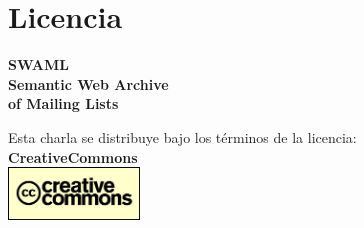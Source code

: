 \documentclass[spanish,notes=hide]{beamer}
\begin{document}
\section{Licencia}
\frame
{
  \begin{center}
    \LARGE{%
	\textbf{SWAML}\\
	\textbf{Semantic Web Archive\\of Mailing Lists}
    }\\
    \vspace{1cm}
    \vspace{1cm}
    \begin{tiny}
	Esta charla se distribuye bajo los términos de la licencia:\\
	\textbf{CreativeCommons}\\
	\includegraphics[width=3.5cm]{images/creativecommons.png}
    \end{tiny}
  \end{center}
}
\end{document}
